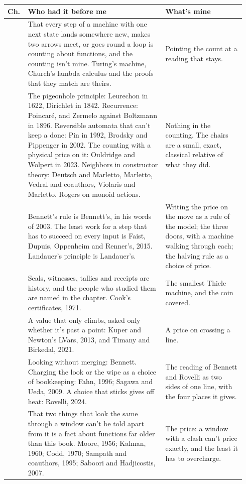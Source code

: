 \documentclass[11pt,twoside]{article}
\theoremstyle{thielethm}
\theoremstyle{thieledef}
\theoremstyle{thieledef}
\theoremstyle{thieledef}
\theoremstyle{thielethm}
\theoremstyle{thieleobs}
\theoremstyle{thielethm}
\begin{document}
\begingroup\small
\begin{longtable}{@{}>{\raggedright\arraybackslash}p{0.07\linewidth}>{\raggedright\arraybackslash}p{0.55\linewidth}>{\raggedright\arraybackslash}p{0.32\linewidth}@{}}
\toprule
\textbf{Ch.} & \textbf{Who had it before me} & \textbf{What's mine} \\
\midrule
\endhead
\bottomrule
\endlastfoot
1 & That every step of a machine with one next state lands somewhere new, makes two arrows meet, or goes round a loop is counting about functions, and the counting isn't mine. Turing's machine, Church's lambda calculus and the proofs that they match are theirs. & Pointing the count at a reading that stays. \\
2 & The pigeonhole principle: Leurechon in 1622, Dirichlet in 1842. Recurrence: Poincar\'e, and Zermelo against Boltzmann in 1896. Reversible automata that can't keep a done: Pin in 1992, Brodsky and Pippenger in 2002. The counting with a physical price on it: Ouldridge and Wolpert in 2023. Neighbors in constructor theory: Deutsch and Marletto, Marletto, Vedral and coauthors, Violaris and Marletto. Rogers on monoid actions. & Nothing in the counting. The chairs are a small, exact, classical relative of what they did. \\
3 & Bennett's rule is Bennett's, in his words of 2003. The least work for a step that has to succeed on every input is Faist, Dupuis, Oppenheim and Renner's, 2015. Landauer's principle is Landauer's. & Writing the price on the move as a rule of the model; the three doors, with a machine walking through each; the halving rule as a choice of price. \\
4 & Seals, witnesses, tallies and receipts are history, and the people who studied them are named in the chapter. Cook's certificates, 1971. & The smallest Thiele machine, and the coin covered. \\
5 & A value that only climbs, asked only whether it's past a point: Kuper and Newton's LVars, 2013, and Timany and Birkedal, 2021. & A price on crossing a line. \\
6 & Looking without merging: Bennett. Charging the look or the wipe as a choice of bookkeeping: Fahn, 1996; Sagawa and Ueda, 2009. A choice that sticks gives off heat: Rovelli, 2024. & The reading of Bennett and Rovelli as two sides of one line, with the four places it gives. \\
7 & That two things that look the same through a window can't be told apart from it is a fact about functions far older than this book. Moore, 1956; Kalman, 1960; Codd, 1970; Sampath and coauthors, 1995; Saboori and Hadjicostis, 2007. & The price: a window with a clash can't price exactly, and the least it has to overcharge. \\

\end{longtable}
\end{document}
